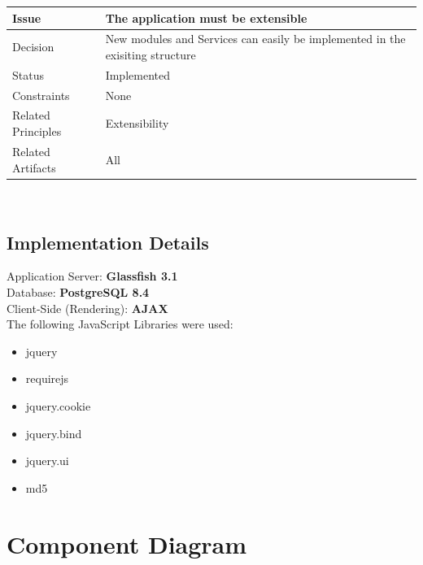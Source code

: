\documentclass[a4paper]{article}
\begin{document}
\begin{tabular}[t]{|l|p{10cm}|}
\hline
\textbf{Issue}	&	The application must be extensible\\
\hline
Decision & New modules and Services can easily be implemented in the exisiting structure\\
\hline
Status	& Implemented\\
\hline
Constraints	&	None\\
\hline
Related Principles	&	Extensibility\\
\hline
Related Artifacts	&	All\\
\hline
\end{tabular}\\

\subsection{Implementation Details}

Application Server: \textbf{Glassfish 3.1}\\
Database: \textbf{PostgreSQL 8.4}\\
Client-Side (Rendering): \textbf{AJAX}\\

The following JavaScript Libraries were used:
\begin{itemize}
\item jquery
\item requirejs
\item jquery.cookie
\item jquery.bind
\item jquery.ui
\item md5
\end{itemize}


\clearpage

\section{Component Diagram}
\end{document}

